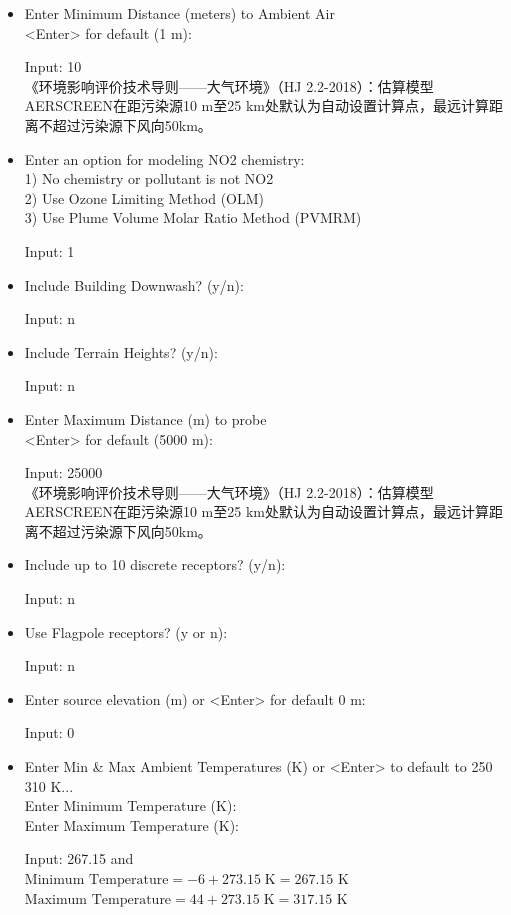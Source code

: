 \begin{framed}
\begin{itemize}[label=\textcolor{orange}{Prompt:}, align=left, leftmargin=*, itemsep=-0.5em]
    \item Enter Minimum Distance (meters) to Ambient Air \\
    <Enter> for default (1 m):
    \item[Input:] 10 \\
    《环境影响评价技术导则——大气环境》（HJ 2.2-2018）：估算模型AERSCREEN在距污染源10 m至25 km处默认为自动设置计算点，最远计算距离不超过污染源下风向50km。
    \item Enter an option for modeling NO2 chemistry: \\
    1) No chemistry or pollutant is not NO2 \\
    2) Use Ozone Limiting Method (OLM) \\
    3) Use Plume Volume Molar Ratio Method (PVMRM)
    \item[Input:] 1
    \item Include Building Downwash? (y/n):
    \item[Input:] n
    \item Include Terrain Heights? (y/n):
    \item[Input:] n
    \item Enter Maximum Distance (m) to probe \\
    <Enter> for default (5000 m):
    \item[Input:] 25000 \\
    《环境影响评价技术导则——大气环境》（HJ 2.2-2018）：估算模型AERSCREEN在距污染源10 m至25 km处默认为自动设置计算点，最远计算距离不超过污染源下风向50km。
    \item Include up to 10 discrete receptors? (y/n):
    \item[Input:] n
    \item Use Flagpole receptors? (y or n):
    \item[Input:] n
    \item Enter source elevation (m) or <Enter> for default 0 m:
    \item[Input:] 0
    \item Enter Min \& Max Ambient Temperatures (K) or <Enter> to default to 250 310 K... \\
    Enter Minimum Temperature (K): \\
    Enter Maximum Temperature (K):
    \item[Input:] 267.15 \quad and  \\
    $\text{Minimum Temperature} = -6+273.15 \;\text{K} = 267.15$ K \\
    $\text{Maximum Temperature} = 44+273.15 \;\text{K} = 317.15$ K

\end{itemize}
\end{framed}
